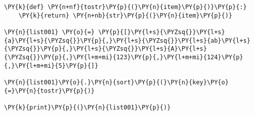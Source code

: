 \begin{Verbatim}[commandchars=\\\{\}]
\PY{k}{def} \PY{n+nf}{tostr}\PY{p}{(}\PY{n}{item}\PY{p}{)}\PY{p}{:}
    \PY{k}{return} \PY{n+nb}{str}\PY{p}{(}\PY{n}{item}\PY{p}{)}

\PY{n}{list001} \PY{o}{=} \PY{p}{[}\PY{l+s}{\PYZsq{}}\PY{l+s}{a}\PY{l+s}{\PYZsq{}}\PY{p}{,}\PY{l+s}{\PYZsq{}}\PY{l+s}{ab}\PY{l+s}{\PYZsq{}}\PY{p}{,}\PY{l+s}{\PYZsq{}}\PY{l+s}{A}\PY{l+s}{\PYZsq{}}\PY{p}{,}\PY{l+m+mi}{123}\PY{p}{,}\PY{l+m+mi}{124}\PY{p}{,}\PY{l+m+mi}{5}\PY{p}{]}

\PY{n}{list001}\PY{o}{.}\PY{n}{sort}\PY{p}{(}\PY{n}{key}\PY{o}{=}\PY{n}{tostr}\PY{p}{)}

\PY{k}{print}\PY{p}{(}\PY{n}{list001}\PY{p}{)}
\end{Verbatim}
